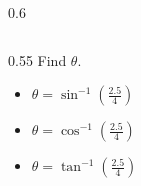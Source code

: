 \documentclass[aspectratio=169]{beamer}
\newcommand{\ashow}[1]{\uncover<2->{\textcolor{red}{\small #1}}}
\begin{document}
\begin{frame}
\begin{columns}[t,onlytextwidth]
\begin{column}{0.6\textwidth}
\begin{columns}[t,onlytextwidth]
\begin{column}{0.55\textwidth}
    Find $\theta$.

     \fontsize{10}{12}\selectfont

    \begin{itemize}
        \item[(A)] $\displaystyle \theta = \sin^{-1}\!\left(\frac{2.5}{4}\right)$
        \item[(B)] $\displaystyle \theta = \cos^{-1}\!\left(\frac{2.5}{4}\right)$
        \item[(C)] $\displaystyle \theta = \tan^{-1}\!\left(\frac{2.5}{4}\right)$
    \end{itemize}

    \ashow{Answer: (A)}

  \end{column}
\end{columns}
\end{column}
\end{columns}

\end{frame}
\end{document}

